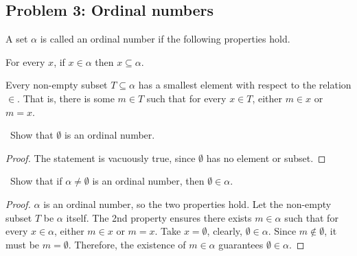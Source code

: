 \documentclass[12pt,a4paper]{amsart}
\newcommand{\bbN}{\mathbb{N}}
\newcommand{\turnin}{\faPencilSquareO}
\begin{document}
\vspace{1em}
\subsection*{Problem 3: Ordinal numbers}
A set $\alpha$ is called an ordinal number if the following properties hold.
\begin{compactitem}
\item For every $x$, if $x \in \alpha$ then $x \subseteq \alpha$.
\item Every non-empty subset $T \subseteq \alpha$ has a smallest element with respect to the relation $\in$.
  That is, there is some $m \in T$ such that for every $x \in T$, either $m \in x$ or $m = x$.
\end{compactitem}
\vspace{0.5em}
\begin{compactenum}[(a)]
  \setlength{\itemsep}{0.5em}
\item \turnin\ Show that $\emptyset$ is an ordinal number.

\begin{proof}
The statement is vacuously true, since $\emptyset$ has no element or subset.
\end{proof}

\item \turnin\ Show that if $\alpha \neq \emptyset$ is an ordinal number, then $\emptyset \in \alpha$.

\begin{proof}
$\alpha$ is an ordinal number, so the two properties hold. Let the non-empty subset $T$ be $\alpha$ itself.
The 2nd property ensures there exists $m \in \alpha$ such that for every $x \in \alpha$, either $m \in x$ or $m=x$.
Take $x=\emptyset$, clearly, $\emptyset \in \alpha$. Since $m \notin \emptyset$, it must be $m=\emptyset$.
Therefore, the existence of $m \in \alpha$ guarantees $\emptyset \in \alpha$.
\end{proof}


\end{compactenum}
\end{document}
